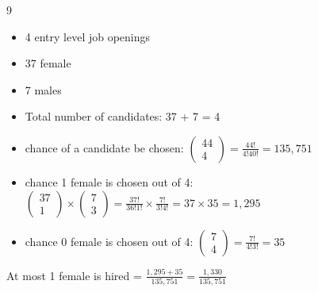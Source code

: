 \documentclass[12 pt]{article}
\begin{document}
    \begin{exercise}{9}
    \hfill

    \begin{itemize}
        \item 4 entry level job openings
        \item 37 female
        \item 7 males

        \item Total number of candidates: 37 + 7 = 4
        \item chance of a candidate be chosen: $\begin{pmatrix}
            44 \\
            4
        \end{pmatrix} = \frac{44!}{4!40!} = 135,751$ 
        
        \item chance 1 female is chosen out of 4: $\begin{pmatrix}
            37 \\
            1
        \end{pmatrix} \times \begin{pmatrix}
            7 \\
            3
        \end{pmatrix} = \frac{37!}{36!1!} \times \frac{7!}{3!4!} = 37 \times 35 = 1,295$
        
        \item chance 0 female is chosen out of 4: $\begin{pmatrix}
            7 \\
            4
        \end{pmatrix} = \frac{7!}{4!3!} = 35$
    \end{itemize}

    At most 1 female is hired = $\frac{1,295 + 35}{135,751} = \frac{1,330}{135,751}$
    \end{exercise}
\end{document}
